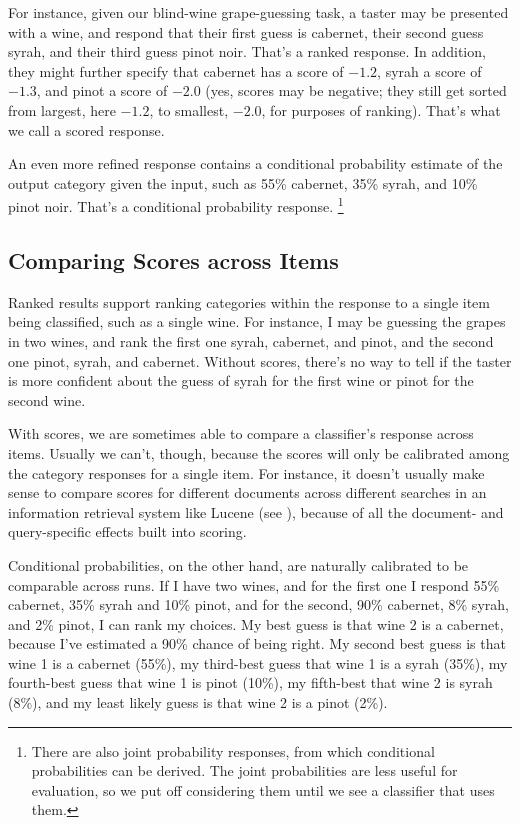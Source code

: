 For instance, given our blind-wine grape-guessing task, a taster may
be presented with a wine, and respond that their first guess is
cabernet, their second guess syrah, and their third guess pinot noir.
That's a ranked response.  In addition, they might further specify
that cabernet has a score of $-1.2$, syrah a score of $-1.3$, and
pinot a score of $-2.0$ (yes, scores may be negative; they still get
sorted from largest, here $-1.2$, to smallest, $-2.0$, for
purposes of ranking).  That's what we call a scored response.  

An even more refined response contains a conditional probability
estimate of the output category given the input, such as 55\%
cabernet, 35\% syrah, and 10\% pinot noir.  That's a conditional
probability response.%
%
\footnote{There are also joint probability responses, from which
  conditional probabilities can be derived.  The joint probabilities
  are less useful for evaluation, so we put off considering them until
  we see a classifier that uses them.}

\subsection{Comparing Scores across Items}

Ranked results support ranking categories within the response to a
single item being classified, such as a single wine.  For instance, I
may be guessing the grapes in two wines, and rank the first one syrah,
cabernet, and pinot, and the second one pinot, syrah, and cabernet.
Without scores, there's no way to tell if the taster is more confident
about the guess of syrah for the first wine or pinot for the second
wine.

With scores, we are sometimes able to compare a classifier's response
across items.  Usually we can't, though, because the scores will only
be calibrated among the category responses for a single item.  For
instance, it doesn't usually make sense to compare scores for
different documents across different searches in an information
retrieval system like Lucene (see ), because of all
the document- and query-specific effects built into scoring.

Conditional probabilities, on the other hand, are naturally calibrated
to be comparable across runs.  If I have two wines, and for the first
one I respond 55\% cabernet, 35\% syrah and 10\% pinot, and for the
second, 90\% cabernet, 8\% syrah, and 2\% pinot, I can rank my
choices.  My best guess is that wine 2 is a cabernet, because I've
estimated a 90\% chance of being right.  My second best guess is that
wine 1 is a cabernet (55\%), my third-best guess that wine 1 is a
syrah (35\%), my fourth-best guess that wine 1 is pinot (10\%), my
fifth-best that wine 2 is syrah (8\%), and my least likely guess is
that wine 2 is a pinot (2\%).

